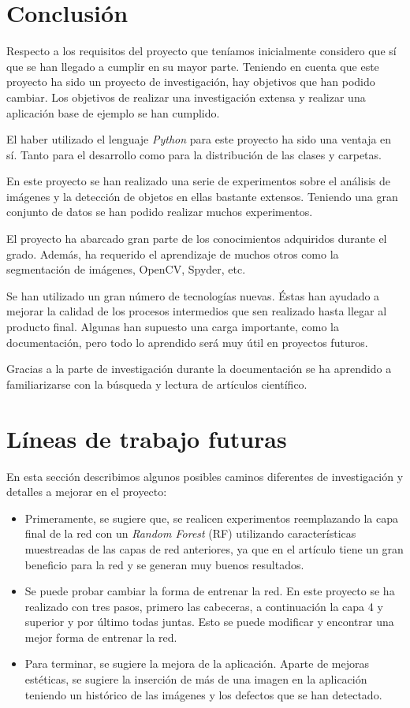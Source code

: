 
\section{Conclusión}

Respecto a los requisitos del proyecto que teníamos inicialmente considero que sí que se han llegado a cumplir en su mayor parte. Teniendo en cuenta que este proyecto ha sido un proyecto de investigación, hay objetivos que han podido cambiar. Los objetivos de realizar una investigación extensa y realizar una aplicación base de ejemplo se han cumplido.

El haber utilizado el lenguaje \textit{Python} para este proyecto ha sido una ventaja en sí. Tanto para el desarrollo como para la distribución de las clases y carpetas.

En este proyecto se han realizado una serie de experimentos sobre el análisis de imágenes y la detección de objetos en ellas bastante extensos. Teniendo una gran conjunto de datos se han podido realizar muchos experimentos.

El proyecto ha abarcado gran parte de los conocimientos adquiridos durante el grado. Además, ha requerido el aprendizaje de muchos otros como la segmentación de imágenes, OpenCV, Spyder, etc.

Se han utilizado un gran número de tecnologías nuevas. Éstas han ayudado a mejorar la calidad de los procesos intermedios que sen realizado hasta llegar al producto final. Algunas han supuesto una carga importante, como la documentación, pero todo lo aprendido será muy útil en proyectos futuros.

Gracias a la parte de investigación durante la documentación se ha aprendido a familiarizarse con la búsqueda y lectura de artículos científico.

\section{Líneas de trabajo futuras}

En esta sección describimos algunos posibles caminos diferentes de investigación y detalles a mejorar en el proyecto:

\begin{itemize}
    \item Primeramente, se sugiere que, se realicen experimentos reemplazando la capa final de la red con un \textit{Random Forest} (RF) utilizando características muestreadas de las capas de red anteriores, ya que en el artículo \cite{articulo:1} tiene un gran beneficio para la red y se generan muy buenos resultados.
    \item Se puede probar cambiar la forma de entrenar la red. En este proyecto se ha realizado con tres pasos, primero las cabeceras, a continuación la capa 4 y superior y por último todas juntas. Esto se puede modificar y encontrar una mejor forma de entrenar la red.
    \item Para terminar, se sugiere la mejora de la aplicación. Aparte de mejoras estéticas, se sugiere la inserción de más de una imagen en la aplicación teniendo un histórico de las imágenes y los defectos que se han detectado.
\end{itemize}
